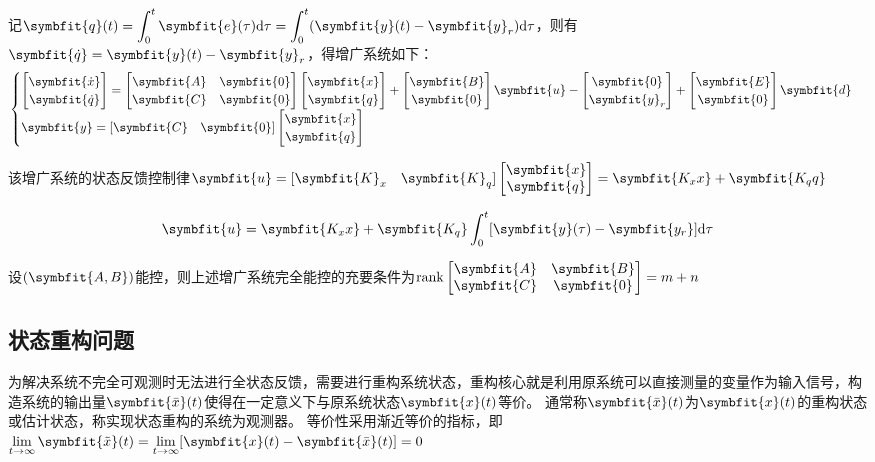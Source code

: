 \documentclass[11pt,a4paper]{ctexart}
\renewcommand{\d}{{\rm d}}
\newcommand{\bm}{\symbfit}
\begin{document}
        记$\displaystyle\bm{q}(t)=\int_0^t\bm{e}(\tau)\d\tau=\int_0^t(\bm{y}(t)-\bm{y}_r)\d\tau$，则有$\bm{\dot q}=\bm{y}(t)-\bm{y}_r$，得增广系统如下：
        \[
        \begin{cases}
        \begin{bmatrix}\bm{\dot{x}}\\ \bm{\dot q}\end{bmatrix}=\begin{bmatrix}\bm{A} & \bm{0}\\ \bm{C} & \bm{0}\end{bmatrix}\begin{bmatrix}\bm{x}\\ \bm{q}\end{bmatrix}
        +\begin{bmatrix}\bm{B}\\\bm{0}\end{bmatrix}\bm{u}
        -\begin{bmatrix}\bm{0}\\\bm{y}_r\end{bmatrix}+\begin{bmatrix}\bm{E}\\\bm{0}\end{bmatrix}\bm{d}\\
        \bm{y}=[\bm{C}\quad\bm{0}]\begin{bmatrix}\bm{x}\\ \bm{q}\end{bmatrix}
        \end{cases}
        \]

        该增广系统的状态反馈控制律$\bm{u}=[\bm{K}_x\quad\bm{K}_q]\begin{bmatrix}\bm{x}\\ \bm{q}\end{bmatrix}=\bm{K_x x}+\bm{K_q q}$
        
        \[
        \bm{u}=\bm{K_x x}+\bm{K_q}\int_0^t[\bm{y}(\tau)-\bm{y_r}]\d\tau
        \]

        设$(\bm{A,B})$能控，则上述增广系统完全能控的充要条件为${\rm rank}\begin{bmatrix}\bm{A}&\bm{B}\\ \bm{C}&\bm{0}\end{bmatrix}=m+n$
    \subsection{状态重构问题}
        为解决系统不完全可观测时无法进行全状态反馈，需要进行重构系统状态，重构核心就是利用原系统可以直接测量的变量作为输入信号，构造系统的输出量$\bm{\bar x}(t)$使得在一定意义下与原系统状态$\bm{x}(t)$等价。
        通常称$\bm{\bar x}(t)$为$\bm{x}(t)$的重构状态或估计状态，称实现状态重构的系统为观测器。
        等价性采用渐近等价的指标，即$\lim\limits_{t\rightarrow\infty}\bm{\tilde x}(t)=\lim\limits_{t\rightarrow\infty}[\bm{x}(t)-\bm{\bar x}(t)]=0$
\end{document}
